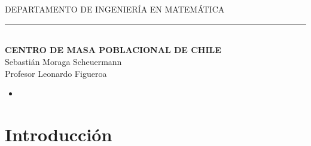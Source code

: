 \documentclass[20pt]{report}
\begin{document}
\begin{center}
\\
\\

{DEPARTAMENTO DE INGENIER\'IA EN MATEM\'ATICA}
\end{center}
\begin{center}
\noindent\rule{15cm}{.5pt}\\
\vspace{2cm}
\textbf{\Large{ CENTRO DE MASA POBLACIONAL DE CHILE}}\\

\Large{Sebasti\'an Moraga Scheuermann}\\

\Large{Profesor Leonardo Figueroa}\\

\end{center}



 \vspace{.2cm}
  \noindent
\begin{itemize}
\item [\bf ]{\bf    }
\topmargin=-1.6cm


\end{itemize}
\topmargin=-1.6cm
\vspace{3cm}
\noindent 






\pagebreak


 \tableofcontents %


\chapter{Introducci\'on}\label{cap.introduccion}
\end{document}
